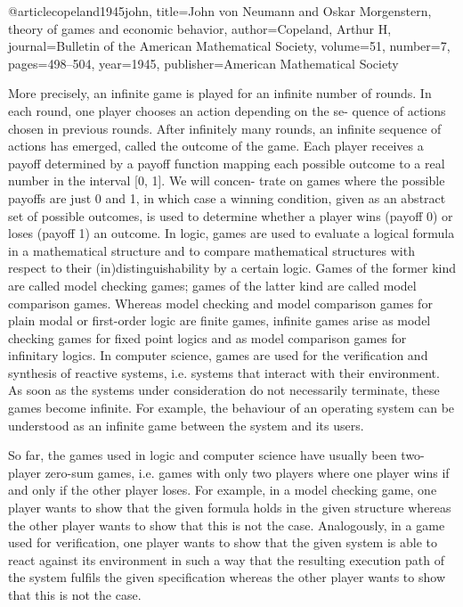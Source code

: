 \documentclass[a4paper,UKenglish,cleveref, autoref, thm-restate]{lipics-v2021}
\begin{document}
@article{copeland1945john,
  title={John von Neumann and Oskar Morgenstern, theory of games and economic behavior},
  author={Copeland, Arthur H},
  journal={Bulletin of the American Mathematical Society},
  volume={51},
  number={7},
  pages={498--504},
  year={1945},
  publisher={American Mathematical Society}
}



More precisely, an infinite game is played for an infinite number of
rounds. In each round, one player chooses an action depending on the se-
quence of actions chosen in previous rounds. After infinitely many rounds,
an infinite sequence of actions has emerged, called the outcome of the game.
Each player receives a payoff determined by a payoff function mapping each
possible outcome to a real number in the interval [0, 1]. We will concen-
trate on games where the possible payoffs are just 0 and 1, in which case a
winning condition, given as an abstract set of possible outcomes, is used to
determine whether a player wins (payoff 0) or loses (payoff 1) an outcome.
In logic, games are used to evaluate a logical formula in a mathematical
structure and to compare mathematical structures with respect to their
(in)distinguishability by a certain logic. Games of the former kind are called
model checking games; games of the latter kind are called model comparison
games. Whereas model checking and model comparison games for plain
modal or first-order logic are finite games, infinite games arise as model
checking games for fixed point logics and as model comparison games for
infinitary logics.
In computer science, games are used for the verification and synthesis
of reactive systems, i.e. systems that interact with their environment. As
soon as the systems under consideration do not necessarily terminate, these
games become infinite. For example, the behaviour of an operating system
can be understood as an infinite game between the system and its users.


So far, the games used in logic and computer science have usually been
two-player zero-sum games, i.e. games with only two players where one
player wins if and only if the other player loses. For example, in a model
checking game, one player wants to show that the given formula holds in the
given structure whereas the other player wants to show that this is not the
case. Analogously, in a game used for verification, one player wants to show
that the given system is able to react against its environment in such a way
that the resulting execution path of the system fulfils the given specification
whereas the other player wants to show that this is not the case.
\end{document}
